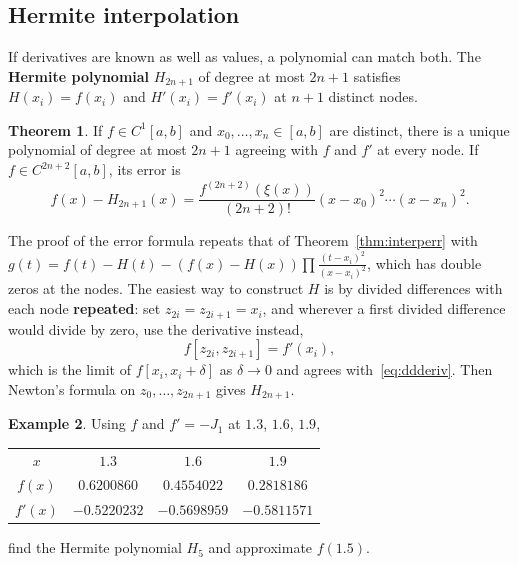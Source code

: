 \documentclass[11pt,a4paper]{article}
\numberwithin{equation}{section}
\theoremstyle{definition}
\newtheorem{thm}{Theorem}[subsection]
\newtheorem{exa}[thm]{Example}
\begin{document}
\subsection{Hermite interpolation}
\label{sec:hermite}

If derivatives are known as well as values, a polynomial can match both. The \textbf{Hermite polynomial} $H_{2n+1}$ of degree at most $2n+1$
satisfies $H(x_i) = f(x_i)$ and $H'(x_i) = f'(x_i)$ at $n+1$ distinct nodes.

\begin{thm}
\label{thm:hermite}
If $f\in C^1[a,b]$ and $x_0,\dots,x_n\in[a,b]$ are distinct, there is a unique polynomial of degree at most $2n+1$ agreeing with $f$ and $f'$
at every node. If $f\in C^{2n+2}[a,b]$, its error is
$$f(x)-H_{2n+1}(x) = \frac{f^{(2n+2)}(\xi(x))}{(2n+2)!}(x-x_0)^2\cdots(x-x_n)^2 .$$
\end{thm}

The proof of the error formula repeats that of Theorem~\ref{thm:interperr} with $g(t) = f(t)-H(t)-(f(x)-H(x))\prod\frac{(t-x_i)^2}{(x-x_i)^2}$, which has
double zeros at the nodes. The easiest way to construct $H$ is by divided differences with each node \textbf{repeated}: set
$z_{2i} = z_{2i+1} = x_i$, and wherever a first divided difference would divide by zero, use the derivative instead,
$$f[z_{2i},z_{2i+1}] = f'(x_i),$$
which is the limit of $f[x_i,x_i+\delta]$ as $\delta\to0$ and agrees with~\eqref{eq:ddderiv}. Then Newton's formula on $z_0,\dots,z_{2n+1}$ gives $H_{2n+1}$.

\begin{exa}
\label{exa:hermite}
Using $f$ and $f' = -J_1$ at $1.3$, $1.6$, $1.9$,
\begin{center}
\begin{tabular}{cccc}
\hline
$x$ & $1.3$ & $1.6$ & $1.9$\\
$f(x)$ & $0.6200860$ & $0.4554022$ & $0.2818186$\\
$f'(x)$ & $-0.5220232$ & $-0.5698959$ & $-0.5811571$\\
\hline
\end{tabular}
\end{center}
find the Hermite polynomial $H_5$ and approximate $f(1.5)$.
\end{exa}
\end{document}
